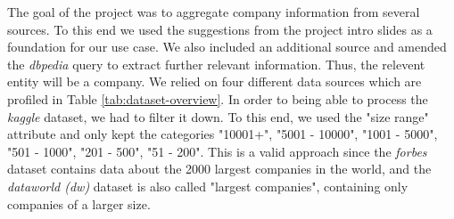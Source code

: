 \documentclass[11pt,titlepage,oneside,openany]{article}
\begin{document}
The goal of the project was to aggregate company information from several sources. To this end we used the suggestions from the project intro slides as a foundation for our use case. We also included an additional source and amended the \textit{dbpedia} query to extract further relevant information. Thus, the relevent entity will be a company.
We relied on four different data sources which are profiled in Table \ref{tab:dataset-overview}. In order to being able to process the \textit{kaggle} dataset, we had to filter it down. To this end, we used the "size range" attribute and only kept the categories "10001+", "5001 - 10000", "1001 - 5000", "501 - 1000", "201 - 500", "51 - 200". This is a valid approach since the \textit{forbes} dataset contains data about the 2000 largest companies in the world, and the \textit{dataworld (dw)} dataset is also called "largest companies", containing only companies of a larger size.
\end{document}
